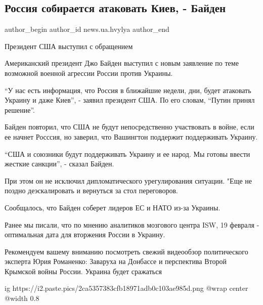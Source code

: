  
 
 
 
 
 
\subsection{Россия собирается атаковать Киев, - Байден}
\label{sec:18_02_2022.stz.news.ua.hvylya.2.rossia_atakovat_kiev_bajden}
 
\ifcmt
 author_begin
   author_id news.ua.hvylya
 author_end
\fi

\begin{zznagolos}
Президент США выступил с обращением	
\end{zznagolos}

Американский президент Джо Байден выступил с новым заявление по теме возможной
военной агрессии России против Украины.


\enquote{У нас есть информация, что Россия в ближайшие недели, дни, будет атаковать
Украину и даже Киев}, - заявил президент США. По его словам, \enquote{Путин принял
решение}.

Байден повторил, что США не будут непосредственно участвовать в войне, если ее
начнет Росссия, но заверил, что Вашингтон поддержит поддерживать Украину.

\enquote{США и союзники будут поддерживать Украину и ее народ. Мы готовы ввести жесткие
санкции}, - сказал Байден.

При этом он не исключил дипломатического урегулирования ситуации. "Еще не
поздно деэскалировать и вернуться за стол переговоров.

Сообщалось, что Байден соберет лидеров ЕС и НАТО из-за Украины.

Ранее мы писали, что по мнению аналитиков мозгового центра ISW, 19 февраля -
оптимальная дата для вторжения России в Украину.

Рекомендуем вашему вниманию посмотреть свежий видеообзор политического эксперта
Юрия Романенко: Заваруха на Донбассе и перспектива Второй Крымской войны
России. Украина будет сражаться

\ifcmt
  ig https://i2.paste.pics/2ca5357383cfb18971adb0c103ae985d.png
  @wrap center
  @width 0.8
\fi
